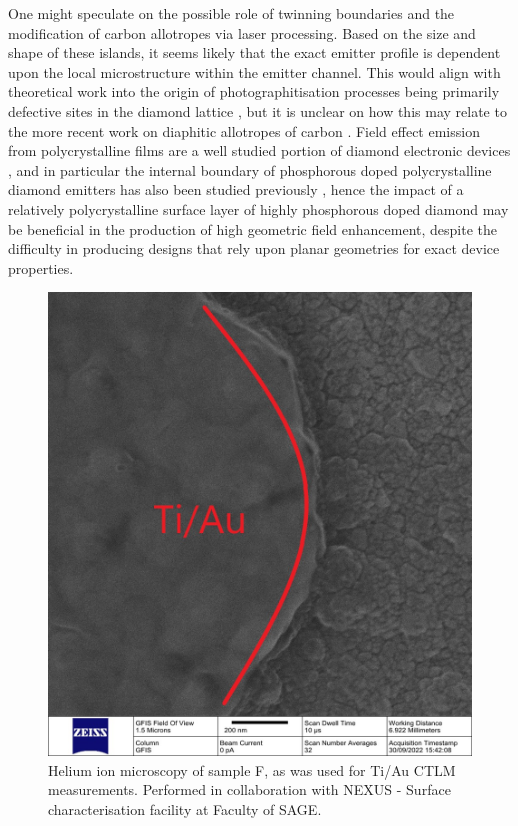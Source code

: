 \begin{refsection}
One might speculate on the possible role of twinning boundaries and the modification of carbon allotropes via laser processing. Based on the size and shape of these islands, it seems likely that the exact emitter profile is dependent upon the local microstructure within the emitter channel. This would align with theoretical work into the origin of photographitisation processes being primarily defective sites in the diamond lattice \cite{Kononenko2009, kononenko:2015}, but it is unclear on how this may relate to the more recent work on diaphitic allotropes of carbon \cite{salter2024, Nemeth2020, Nemeth20202, Nemeth2021}. Field effect emission from polycrystalline films are a well studied portion of diamond electronic devices \cite{Sugino1998, Watanabe2001, Watanabe2003}, and in particular the internal boundary of phosphorous doped polycrystalline diamond emitters has also been studied previously \cite{Sugino19982}, hence the impact of a relatively polycrystalline surface layer of highly phosphorous doped diamond may be beneficial in the production of high geometric field enhancement, despite the difficulty in producing designs that rely upon planar geometries for exact device properties.

\begin{figure}[H]
    \centering
    \includegraphics[width=\linewidth]{Chapter7/Figs/Raster/him 007 A.6.jpg}
    \caption{Helium ion microscopy of sample F, as was used for Ti/Au CTLM measurements. Performed in collaboration with NEXUS - Surface characterisation facility at Faculty of SAGE.}
    \label{fig:him_2}
\end{figure}


\end{refsection}
